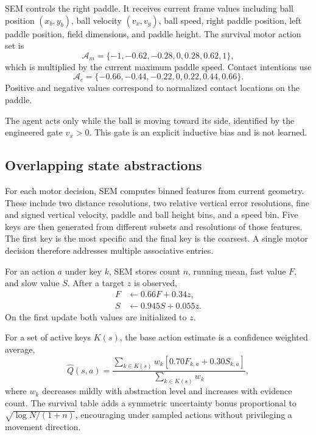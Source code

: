 \documentclass[10pt,twocolumn]{article}
\begin{document}
SEM controls the right paddle. It receives current frame values including ball position $(x_b,y_b)$, ball velocity $(v_x,v_y)$, ball speed, right paddle position, left paddle position, field dimensions, and paddle height. The survival motor action set is
\begin{equation}
\mathcal{A}_m=\{-1,-0.62,-0.28,0,0.28,0.62,1\},
\end{equation}
which is multiplied by the current maximum paddle speed. Contact intentions use
\begin{equation}
\mathcal{A}_c=\{-0.66,-0.44,-0.22,0,0.22,0.44,0.66\}.
\end{equation}
Positive and negative values correspond to normalized contact locations on the paddle.

The agent acts only while the ball is moving toward its side, identified by the engineered gate $v_x>0$. This gate is an explicit inductive bias and is not learned.

\subsection{Overlapping state abstractions}
For each motor decision, SEM computes binned features from current geometry. These include two distance resolutions, two relative vertical error resolutions, fine and signed vertical velocity, paddle and ball height bins, and a speed bin. Five keys are then generated from different subsets and resolutions of those features. The first key is the most specific and the final key is the coarsest. A single motor decision therefore addresses multiple associative entries.

For an action $a$ under key $k$, SEM stores count $n$, running mean, fast value $F$, and slow value $S$. After a target $z$ is observed,
\begin{align}
F &\leftarrow 0.66F+0.34z,\\
S &\leftarrow 0.945S+0.055z.
\end{align}
On the first update both values are initialized to $z$.

For a set of active keys $K(s)$, the base action estimate is a confidence weighted average,
\begin{equation}
\hat{Q}(s,a)=\frac{\sum_{k\in K(s)} w_k[0.70F_{k,a}+0.30S_{k,a}]}{\sum_{k\in K(s)}w_k},
\end{equation}
where $w_k$ decreases mildly with abstraction level and increases with evidence count. The survival table adds a symmetric uncertainty bonus proportional to $\sqrt{\log N/(1+n)}$, encouraging under sampled actions without privileging a movement direction.
\end{document}
